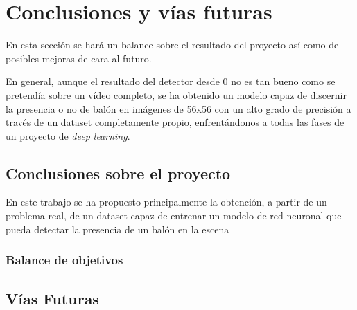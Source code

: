 \section{Conclusiones y vías futuras}
En esta sección se hará un balance sobre el resultado del proyecto así como de posibles mejoras de cara al futuro. 

En general, aunque el resultado del detector desde 0 no es tan bueno como se pretendía sobre un vídeo completo, se ha obtenido un modelo capaz de discernir la presencia o no de balón en imágenes de 56x56 con un alto grado de precisión a través de un dataset completamente propio, enfrentándonos a todas las fases de un proyecto de \textit{deep learning}.

\subsection{Conclusiones sobre el proyecto}

En este trabajo se ha propuesto principalmente la obtención, a partir de un problema real, de un dataset capaz de entrenar un modelo de red neuronal que pueda detectar la presencia de un balón en la escena

\subsubsection*{Balance de objetivos}

\subsection{Vías Futuras}
